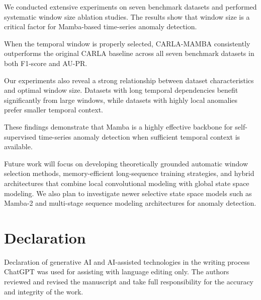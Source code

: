 \documentclass[runningheads]{llncs}
\begin{document}
We conducted extensive experiments on seven benchmark datasets and performed systematic window size ablation studies. The results show that window size is a critical factor for Mamba-based time-series anomaly detection.

When the temporal window is properly selected, CARLA-MAMBA consistently outperforms the original CARLA baseline across all seven benchmark datasets in both F1-score and AU-PR.

Our experiments also reveal a strong relationship between dataset characteristics and optimal window size. Datasets with long temporal dependencies benefit significantly from large windows, while datasets with highly local anomalies prefer smaller temporal context.

These findings demonstrate that Mamba is a highly effective backbone for self-supervised time-series anomaly detection when sufficient temporal context is available.

Future work will focus on developing theoretically grounded automatic window selection methods, memory-efficient long-sequence training strategies, and hybrid architectures that combine local convolutional modeling with global state space modeling. We also plan to investigate newer selective state space models such as Mamba-2 and multi-stage sequence modeling architectures for anomaly detection.

\section*{Declaration}
Declaration of generative AI and AI-assisted technologies in the writing process ChatGPT was used for assisting with language editing only. The authors reviewed and revised the manuscript and take full responsibility for the accuracy and integrity of the work.



\end{document}
